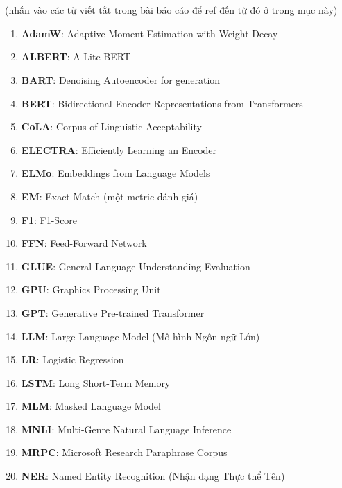 \section*{\acronymsname} \label{danh-muc-thuat-ngu-viet-tat}
(nhấn vào các từ viết tắt trong bài báo cáo để ref đến từ đó ở trong mục này)
\begin{enumerate}[label=--, wide, labelindent=0pt]
    \item \textbf{AdamW}: Adaptive Moment Estimation with Weight Decay \label{acro:adamw}
    \item \textbf{ALBERT}: A Lite BERT \label{acro:albert}
    \item \textbf{BART}: Denoising Autoencoder for generation \label{acro:bart}
    \item \textbf{BERT}: Bidirectional Encoder Representations from Transformers \label{acro:bert}
    \item \textbf{CoLA}: Corpus of Linguistic Acceptability \label{acro:cola}
    \item \textbf{ELECTRA}: Efficiently Learning an Encoder \label{acro:electra}
    \item \textbf{ELMo}: Embeddings from Language Models \label{acro:elmo}
    \item \textbf{EM}: Exact Match (một metric đánh giá) \label{acro:em}
    \item \textbf{F1}: F1-Score \label{acro:f1}
    \item \textbf{FFN}: Feed-Forward Network \label{acro:ffn}
    \item \textbf{GLUE}: General Language Understanding Evaluation \label{acro:glue}
    \item \textbf{GPU}: Graphics Processing Unit \label{acro:gpu}
    \item \textbf{GPT}: Generative Pre-trained Transformer \label{acro:gpt}
    \item \textbf{LLM}: Large Language Model (Mô hình Ngôn ngữ Lớn) \label{acro:llm}
    \item \textbf{LR}: Logistic Regression  \label{acro:lr}
    \item \textbf{LSTM}: Long Short-Term Memory \label{acro:lstm}
    \item \textbf{MLM}: Masked Language Model  \label{acro:mlm}
    \item \textbf{MNLI}: Multi-Genre Natural Language Inference \label{acro:mnli}
    \item \textbf{MRPC}: Microsoft Research Paraphrase Corpus \label{acro:mrpc}
    \item \textbf{NER}: Named Entity Recognition (Nhận dạng Thực thể Tên) \label{acro:ner}

\end{enumerate}
